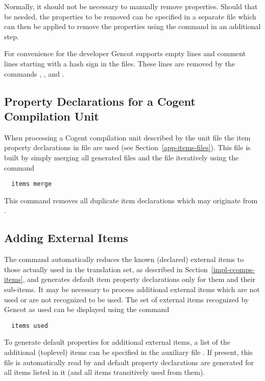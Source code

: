 Normally, it should not be necessary to manually remove properties. Should that be needed, the properties to be removed can
be specified in a separate file which can then be applied to remove the properties using the command  in 
an additional step.

For convenience for the developer Gencot supports empty lines and comment lines starting with a hash sign \code{\#} in the 
 files. These lines are removed by the commands , , and .

\subsection{Property Declarations for a Cogent Compilation Unit}
\label{app-items-unit}

When processing a Cogent compilation unit described by the unit file  the item property declarations in file
 are used (see Section~\ref{app-items-files}). This file is built by simply merging all
generated files  and the file  iteratively using the command
\begin{verbatim}
  items merge
\end{verbatim}
This command removes all duplicate item declarations which may originate from .

\subsection{Adding External Items}
\label{app-items-extern}

The command  automatically reduces the known (declared) external items to those actually used in the
translation set, as described in Section~\ref{impl-ccomps-items}, and generates default item property declarations only
for them and their sub-items. It may be necessary to process additional external items which are not used or are not recognized
to be used. The set of external items recognized by Gencot as used can be displayed using the command
\begin{verbatim}
  items used
\end{verbatim}

To generate default properties for additional external items, a list of the additional (toplevel) items can be 
specified in the auxiliary file . If present, this file is automatically read by 
and default property declarations are generated for all items listed in it (and all items transitively used from them).

